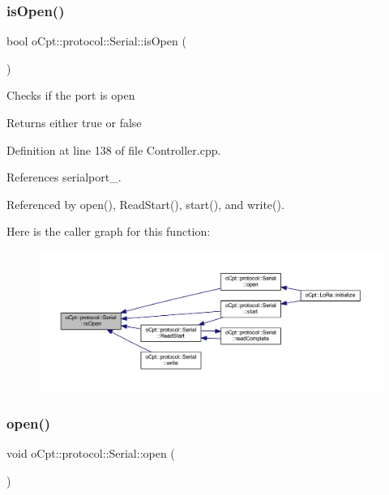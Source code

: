 \subsubsection{\texorpdfstring{is\+Open()}{isOpen()}}
{\footnotesize\ttfamily bool o\+Cpt\+::protocol\+::\+Serial\+::is\+Open (\begin{DoxyParamCaption}{ }\end{DoxyParamCaption})}

Checks if the port is open \begin{DoxyReturn}{Returns}
either true or false 
\end{DoxyReturn}


Definition at line 138 of file Controller.\+cpp.



References serialport\+\_\+.



Referenced by open(), Read\+Start(), start(), and write().

Here is the caller graph for this function\+:\nopagebreak
\begin{figure}[H]
\begin{center}
\leavevmode
\includegraphics[width=350pt]{classo_cpt_1_1protocol_1_1_serial_ab63afb811bbfd0da9cba8a4edf8d76fe_icgraph}
\end{center}
\end{figure}
\hypertarget{classo_cpt_1_1protocol_1_1_serial_a7738b1566f37b36c97055a8800482a10}{}\label{classo_cpt_1_1protocol_1_1_serial_a7738b1566f37b36c97055a8800482a10} 
\subsubsection{\texorpdfstring{open()}{open()}}
{\footnotesize\ttfamily void o\+Cpt\+::protocol\+::\+Serial\+::open (\begin{DoxyParamCaption}{ }\end{DoxyParamCaption})}

